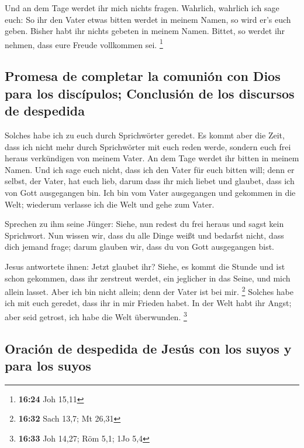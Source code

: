  Und an dem Tage werdet ihr mich nichts fragen. Wahrlich,
wahrlich ich sage euch: So ihr den Vater etwas bitten werdet in meinem
Namen, so wird er's euch geben.  Bisher habt ihr nichts
gebeten in meinem Namen. Bittet, so werdet ihr nehmen, dass eure Freude
vollkommen sei. \footnote{\textbf{16:24} Joh 15,11}

\hypertarget{promesa-de-completar-la-comuniuxf3n-con-dios-para-los-discuxedpulos-conclusiuxf3n-de-los-discursos-de-despedida}{%
\subsection{Promesa de completar la comunión con Dios para los
discípulos; Conclusión de los discursos de
despedida}\label{promesa-de-completar-la-comuniuxf3n-con-dios-para-los-discuxedpulos-conclusiuxf3n-de-los-discursos-de-despedida}}

 Solches habe ich zu euch durch Sprichwörter geredet. Es
kommt aber die Zeit, dass ich nicht mehr durch Sprichwörter mit euch
reden werde, sondern euch frei heraus verkündigen von meinem Vater.
 An dem Tage werdet ihr bitten in meinem Namen. Und ich
sage euch nicht, dass ich den Vater für euch bitten will;
 denn er selbst, der Vater, hat euch lieb, darum dass ihr
mich liebet und glaubet, dass ich von Gott ausgegangen bin.
 Ich bin vom Vater ausgegangen und gekommen in die Welt;
wiederum verlasse ich die Welt und gehe zum Vater.

 Sprechen zu ihm seine Jünger: Siehe, nun redest du frei
heraus und sagst kein Sprichwort.  Nun wissen wir, dass
du alle Dinge weißt und bedarfst nicht, dass dich jemand frage; darum
glauben wir, dass du von Gott ausgegangen bist.

 Jesus antwortete ihnen: Jetzt glaubet ihr?
 Siehe, es kommt die Stunde und ist schon gekommen, dass
ihr zerstreut werdet, ein jeglicher in das Seine, und mich allein
lasset. Aber ich bin nicht allein; denn der Vater ist bei mir.
\footnote{\textbf{16:32} Sach 13,7; Mt 26,31}  Solches
habe ich mit euch geredet, dass ihr in mir Frieden habet. In der Welt
habt ihr Angst; aber seid getrost, ich habe die Welt überwunden.
\footnote{\textbf{16:33} Joh 14,27; Röm 5,1; 1Jo 5,4}

\hypertarget{oraciuxf3n-de-despedida-de-jesuxfas-con-los-suyos-y-para-los-suyos}{%
\subsection{Oración de despedida de Jesús con los suyos y para los
suyos}\label{oraciuxf3n-de-despedida-de-jesuxfas-con-los-suyos-y-para-los-suyos}}

